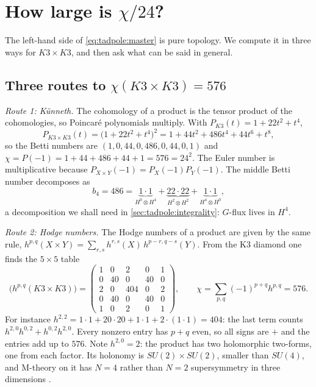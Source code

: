 \section{How large is \texorpdfstring{$\chi/24$}{chi/24}?}\label{sec:tadpole:euler}

The left-hand side of \eqref{eq:tadpole:master} is pure topology. We compute it in three
ways for $K3\times K3$, and then ask what can be said in general.

\subsection{Three routes to \texorpdfstring{$\chi(K3\times K3)=576$}{chi(K3 x K3) = 576}}
\emph{Route 1: K\"unneth.} The cohomology of a product is the tensor
product of the cohomologies, so Poincar\'e polynomials multiply. With
$P_{K3}(t)=1+22t^2+t^4$,
\begin{equation}\label{eq:tadpole:poincare}
 P_{K3\times K3}(t)=\bigl(1+22t^2+t^4\bigr)^2=1+44t^2+486t^4+44t^6+t^8 ,
\end{equation}
so the Betti numbers are $(1,0,44,0,486,0,44,0,1)$ and
$\chi=P(-1)=1+44+486+44+1=576=24^2$. The Euler number is multiplicative because
$P_{X\times Y}(-1)=P_X(-1)P_Y(-1)$. The middle Betti number decomposes as
\begin{equation}\label{eq:tadpole:b4}
 b_4=486=\underbrace{1\cdot1}_{H^0\otimes H^4}+\underbrace{22\cdot22}_{H^2\otimes H^2}
 +\underbrace{1\cdot1}_{H^4\otimes H^0},
\end{equation}
a decomposition we shall need in \cref{sec:tadpole:integrality}: $G$-flux lives in $H^4$.

\emph{Route 2: Hodge numbers.} The Hodge numbers of a product are given by the same rule,
$h^{p,q}(X\times Y)=\sum_{r,s}h^{r,s}(X)\,h^{p-r,q-s}(Y)$. From the K3 diamond one finds
the $5\times5$ table
\begin{equation}\label{eq:tadpole:hodge}
 \bigl(h^{p,q}(K3\times K3)\bigr)=
 \begin{pmatrix}1&0&2&0&1\\0&40&0&40&0\\2&0&404&0&2\\0&40&0&40&0\\1&0&2&0&1\end{pmatrix},
 \qquad \chi=\sum_{p,q}(-1)^{p+q}h^{p,q}=576 .
\end{equation}
For instance $h^{2,2}=1\cdot1+20\cdot20+1\cdot1+2\cdot(1\cdot1)=404$: the last term counts
$h^{2,0}h^{0,2}+h^{0,2}h^{2,0}$. Every nonzero entry has $p+q$ even, so all signs are $+$ and
the entries add up to $576$. Note $h^{2,0}=2$: the product has two holomorphic two-forms,
one from each factor. Its holonomy is $SU(2)\times SU(2)$, smaller than $SU(4)$, and M-theory
on it has $N=4$ rather than $N=2$ supersymmetry in three dimensions
.

